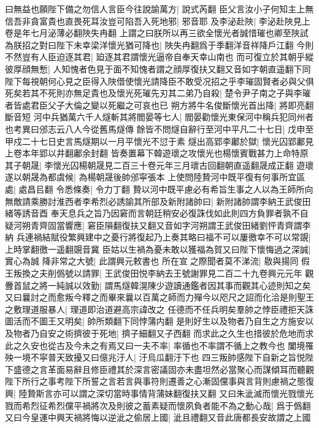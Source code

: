 曰無益也願陛下備之勿信人言臣今往說諭萬方|{
	說式芮翻}
臣父言汝小子何知主上無信吾非貪富貴也直畏死耳汝豈可陷吾入死地邪|{
	邪音耶}
及李泌赴陜|{
	李泌赴陜見上卷是年七月泌薄必翻陜失冉翻}
上謂之曰朕所以再三欲全懷光者誠惜璀也卿至陜試為朕招之對曰陛下未幸梁洋懷光猶可降也|{
	陜失冉翻爲于季翻洋音祥降戶江翻}
今則不然豈有人臣迫逐其君|{
	廹逐其君謂懷光逼帝自奉天幸山南也}
而可復立於其朝乎縱彼厚顔無慙|{
	人知愧者色見于面不知愧者謂之顔厚復扶又翻又音如字朝直遥翻下同}
陛下每視朝何心見之臣得入陜借使懷光請降臣不敢受况招之乎李璀固賢者必與父俱死矣若其不死則亦無足貴也及懷光死璀先刃其二弟乃自殺|{
	楚令尹子南之子與李璀者皆處君臣父子大倫之變以死繼之可哀也已}
朔方將牛名俊斷懷光首出降|{
	將即亮翻斷音短}
河中兵猶萬六千人燧斬其將閻晏等七人|{
	閻晏勸懷光東保河中稱兵犯同州者也考異曰邠志云八人今從舊馬燧傳}
餘皆不問燧自辭行至河中平凡二十七日|{
	戊申至甲戍二十七日史言馬燧期以一月平懷光不愆于素}
燧出高郢李鄘於獄|{
	懷光囚郢鄘見上卷本年郢以井翻鄘余封翻}
皆奏置幕下韓遊瓌之攻懷光也楊懷賓戰甚力上命特原其子朝晟|{
	李懷光囚楊朝晟見二百三十卷元年三月瓌古回翻朝直遥翻晟成正翻}
遊瓌遂以朝晟為都虞候|{
	為楊朝晟後帥邠寜張本}
上使問陸贄河中既平復有何事所宜區處|{
	處昌㠯翻}
令悉條奏|{
	令力丁翻}
贄以河中既平慮必有希旨生事之人以為王師所向無敵請乘勝討淮西者李希烈必誘諭其所部及新附諸帥曰|{
	新附諸帥謂李納王武俊田緒等誘音酉}
奉天息兵之旨乃因窘而言朝廷稍安必復誅伐如此則四方負罪者孰不自疑河朔青齊固當響應|{
	窘臣隕翻復扶又翻又音如字河朔謂王武俊田緒劉怦青齊謂李納}
兵連禍結賦役繁興建中之憂行將復起乃上奏其略曰福不可以屢徼幸不可以常覬|{
	上時掌翻徼一遥翻覬音冀}
臣姑以生禍為憂未敢以獲福為賀又曰陛下懷悔過之深誠|{
	實心為誠}
降非常之大號|{
	此謂興元敕書也}
所在宣之際聞者莫不涕流|{
	敭與揚同}
假王叛換之夫削僞號以請罪|{
	王武俊田悦李納去王號謝罪見二百二十九卷興元元年}
觀釁首鼠之將一純誠以效勤|{
	謂馬燧韓滉陳少遊讀通鑑者因其事而觀其心迹則知之矣}
又曰曩討之而愈叛今釋之而畢來曩以百萬之師而力殫今以咫尺之詔而化洽是則聖王之敷理道服暴人|{
	理道即治道避高宗諱改之}
任德而不任兵明矣羣帥之悖臣禮拒天誅圖活而不圖王又明矣|{
	帥所類翻下同悖蒲内翻}
是則好生以及物者乃自生之方施安以及物者乃自安之術擠彼于死地|{
	擠子細翻又子西翻}
而求此之久生也措彼於危地而求此之久安也從古及今未之有焉又曰一夫不率|{
	率循也不率謂不循上之教今也}
闔境罹殃一境不寜普天致擾又曰億兆汙人|{
	汙烏瓜翻汙下也}
四三叛帥感陛下自新之旨悦陛下盛德之言革面易辭且修臣禮其於深言密議固亦未盡坦然必當聚心而謀傾耳而聽觀陛下所行之事考陛下所誓之言若言與事符則遷善之心漸固儻事與言背則慮禍之態復興|{
	陸贄斯言亦可以謂之深切當時事情背蒲妹翻復扶又翻}
又曰朱泚滅而懷光戮懷光戮而希烈征希烈儻平禍將次及則彼之蓄素疑而懷夙負者能不為之動心哉|{
	爲于僞翻}
又曰今皇運中興天禍將悔以逆泚之偷居上國|{
	泚且禮翻又音此唐都長安故謂之上國}
